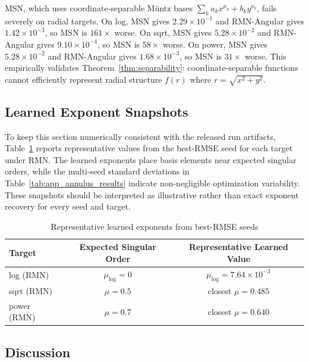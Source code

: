 \documentclass[twoside,11pt]{article}
\begin{document}
MSN, which uses coordinate-separable M\"untz bases $\sum_k a_k x^{\mu_k} + b_k y^{\nu_k}$, fails severely on radial targets. On log, MSN gives $2.29\times 10^{-1}$ and RMN-Angular gives $1.42\times 10^{-3}$, so MSN is $161\times$ worse. On sqrt, MSN gives $5.28\times 10^{-2}$ and RMN-Angular gives $9.10\times 10^{-4}$, so MSN is $58\times$ worse. On power, MSN gives $5.28\times 10^{-2}$ and RMN-Angular gives $1.68\times 10^{-3}$, so MSN is $31\times$ worse. This empirically validates Theorem~\ref{thm:separability}: coordinate-separable functions cannot efficiently represent radial structure $f(r)$ where $r = \sqrt{x^2+y^2}$.

\subsection{Learned Exponent Snapshots}

To keep this section numerically consistent with the released run artifacts, Table~\ref{tab:app_annulus_learned_exponents} reports representative values from the best-RMSE seed for each target under RMN. The learned exponents place basis elements near expected singular orders, while the multi-seed standard deviations in Table~\ref{tab:app_annulus_results} indicate non-negligible optimization variability. These snapshots should be interpreted as illustrative rather than exact exponent recovery for every seed and target.

\begin{table}[t]
	\centering
	\begin{tabular}{lcc}
		\toprule
		Target      & Expected Singular Order & Representative Learned Value    \\
		\midrule
		log (RMN)   & $\mu_{\log}=0$          & $\mu_{\log}=7.64\times 10^{-3}$ \\
		sqrt (RMN)  & $\mu=0.5$               & closest $\mu=0.485$             \\
		power (RMN) & $\mu=0.7$               & closest $\mu=0.640$             \\
		\bottomrule
	\end{tabular}
	\caption{Representative learned exponents from best-RMSE seeds}
	\label{tab:app_annulus_learned_exponents}

\end{table}


\subsection{Discussion}
\end{document}
